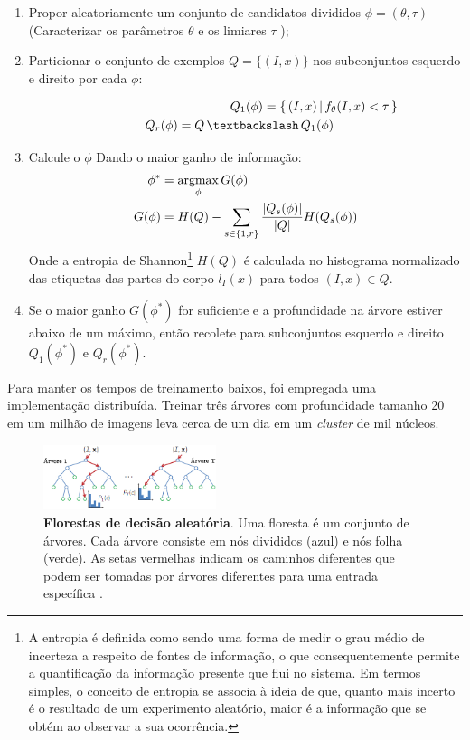 \begin{enumerate}
    \item Propor aleatoriamente um conjunto de candidatos divididos $\phi = ({\theta}, \tau)$ (Caracterizar os parâmetros $\theta$ e os limiares $\tau$ );
    \item Particionar o conjunto de exemplos $Q = \{(I, x)\}$ nos subconjuntos esquerdo e direito por cada $\phi$:
    
        \begin{align}
            Q_{1}(\phi) = \{\,(I, x)\,|\, {f_{\theta}}(I, x) < \tau\,\} \\
            Q_{r}(\phi) = Q\, \textbackslash \,Q_{1}(\phi) \MoveEqLeft[5.1] 
            \label{eq:eq3_4}
        \end{align}
    \item Calcule o $\phi$ Dando o maior ganho de informação:
    \begin{align}
            \phi^* &= \operatornamewithlimits{argmax}_\phi G(\phi) \\
             G(\phi) &= H(Q) - \sum_{s\in \{1,r\}} \frac{|Q_{s}(\phi)|}{|Q|}H(Q_{s}(\phi))
            \label{eq:eq5_6}
        \end{align}
        Onde a entropia de Shannon\footnote{A entropia é definida como sendo uma forma de medir o grau médio de incerteza a respeito de fontes de informação, o que consequentemente permite a quantificação da informação presente que flui no sistema. Em termos simples, o conceito de entropia se associa à ideia de que, quanto mais incerto é o resultado de um experimento aleatório, maior é a informação que se obtém ao observar a sua ocorrência.} \cite{shannon2001mathematical}
$H(Q)$ é calculada no histograma normalizado das etiquetas das partes do corpo $l_{I}(x)$ para todos $(I,x) \in Q$.
    \item Se o maior ganho $G(\phi^{*})$ for suficiente e a profundidade na árvore estiver abaixo de um máximo, então recolete para subconjuntos esquerdo e direito $Q_{1}(\phi^{*})$ e $Q_{r}(\phi^{*})$.
\end{enumerate}

Para manter os tempos de treinamento baixos, foi empregada uma implementação distribuída. Treinar três árvores com profundidade tamanho 20 em um milhão de imagens leva cerca de um dia em um \textit{cluster} de mil núcleos.

\begin{figure}[ht]
\centering
\includegraphics[resolution=300,width=0.45\textwidth,natwidth=610,natheight=642]{images/tree_decision.png}
    \caption{\textbf{Florestas de decisão aleatória}. Uma floresta é um conjunto de árvores. Cada árvore consiste em nós divididos (azul) e nós folha (verde). As setas vermelhas indicam os caminhos diferentes que podem ser tomadas por árvores diferentes para uma entrada específica \cite{Shotton:2013:RHP:2398356.2398381}.}
    \label{fig:decisionTree}
\end{figure}

